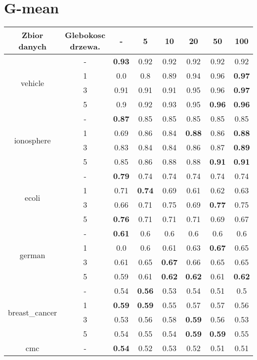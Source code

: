 \documentclass{article}%
\begin{document}
\section*{G{-}mean}%
\begin{longtable}{c|c|cccccc}%
\hline%
Zbior danych&Glebokosc drzewa.&{-}&5&10&20&50&100\\%
\hline%
\multirow{4}{*}{vehicle}&{-}&\textbf{0.93}&0.92&0.92&0.92&0.92&0.92\\%
\cline{2%
-%
8}%
&1&0.0&0.8&0.89&0.94&0.96&\textbf{0.97}\\%
\cline{2%
-%
8}%
&3&0.91&0.91&0.91&0.95&0.96&\textbf{0.97}\\%
\cline{2%
-%
8}%
&5&0.9&0.92&0.93&0.95&\textbf{0.96}&\textbf{0.96}\\%
\hline%
\multirow{4}{*}{ionosphere}&{-}&\textbf{0.87}&0.85&0.85&0.85&0.85&0.85\\%
\cline{2%
-%
8}%
&1&0.69&0.86&0.84&\textbf{0.88}&0.86&\textbf{0.88}\\%
\cline{2%
-%
8}%
&3&0.83&0.84&0.84&0.86&0.87&\textbf{0.89}\\%
\cline{2%
-%
8}%
&5&0.85&0.86&0.88&0.88&\textbf{0.91}&\textbf{0.91}\\%
\hline%
\multirow{4}{*}{ecoli}&{-}&\textbf{0.79}&0.74&0.74&0.74&0.74&0.74\\%
\cline{2%
-%
8}%
&1&0.71&\textbf{0.74}&0.69&0.61&0.62&0.63\\%
\cline{2%
-%
8}%
&3&0.66&0.71&0.75&0.69&\textbf{0.77}&0.75\\%
\cline{2%
-%
8}%
&5&\textbf{0.76}&0.71&0.71&0.71&0.69&0.67\\%
\hline%
\multirow{4}{*}{german}&{-}&\textbf{0.61}&0.6&0.6&0.6&0.6&0.6\\%
\cline{2%
-%
8}%
&1&0.0&0.6&0.61&0.63&\textbf{0.67}&0.65\\%
\cline{2%
-%
8}%
&3&0.61&0.65&\textbf{0.67}&0.66&0.65&0.65\\%
\cline{2%
-%
8}%
&5&0.59&0.61&\textbf{0.62}&\textbf{0.62}&0.61&\textbf{0.62}\\%
\hline%
\multirow{4}{*}{breast\_cancer}&{-}&0.54&\textbf{0.56}&0.53&0.54&0.51&0.5\\%
\cline{2%
-%
8}%
&1&\textbf{0.59}&\textbf{0.59}&0.55&0.57&0.57&0.56\\%
\cline{2%
-%
8}%
&3&0.53&0.56&0.58&\textbf{0.59}&0.56&0.53\\%
\cline{2%
-%
8}%
&5&0.54&0.55&0.54&\textbf{0.59}&\textbf{0.59}&0.55\\%
\hline%
\multirow{4}{*}{cmc}&{-}&\textbf{0.54}&0.52&0.53&0.52&0.51&0.51\\%

\end{longtable}
\end{document}
